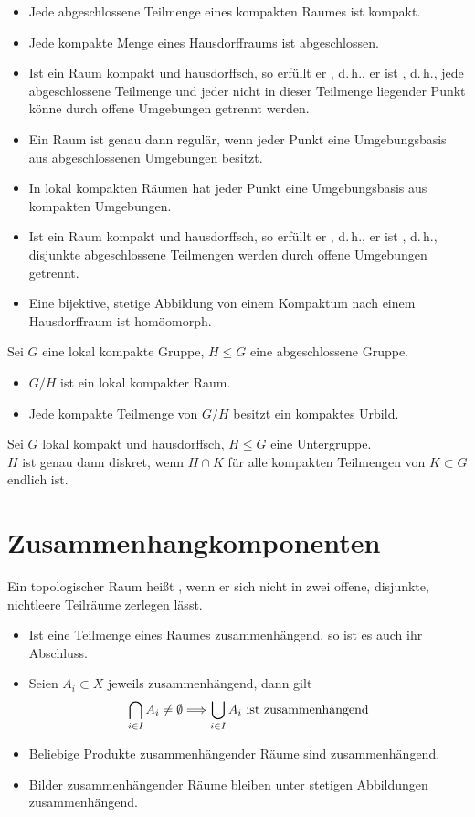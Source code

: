 \documentclass{book}
\begin{document}
\Bem{}
\begin{itemize}
\item Jede abgeschlossene Teilmenge eines kompakten Raumes ist kompakt.
\item Jede kompakte Menge eines Hausdorffraums ist abgeschlossen.
\item Ist ein Raum kompakt und hausdorffsch, so erfüllt er , d.\,h., er ist , d.\,h., jede abgeschlossene Teilmenge und jeder nicht in dieser Teilmenge liegender Punkt könne durch offene Umgebungen getrennt werden.
\item Ein Raum ist genau dann regulär, wenn jeder Punkt eine Umgebungsbasis aus abgeschlossenen Umgebungen besitzt.
\item In lokal kompakten Räumen hat jeder Punkt eine Umgebungsbasis aus kompakten Umgebungen.
\item Ist ein Raum kompakt und hausdorffsch, so erfüllt er , d.\,h., er ist , d.\,h., disjunkte abgeschlossene Teilmengen werden durch offene Umgebungen getrennt.
\item Eine bijektive, stetige Abbildung von einem Kompaktum nach einem Hausdorffraum ist homöomorph.
\end{itemize}

\Prop{}
Sei $G$ eine lokal kompakte Gruppe, $H\leq G$ eine abgeschlossene Gruppe.
\begin{itemize}
\item $G/H$ ist ein lokal kompakter Raum.
\item Jede kompakte Teilmenge von $G/H$ besitzt ein kompaktes Urbild.
\end{itemize}

\Prop{}
Sei $G$ lokal kompakt und hausdorffsch, $H \leq G$ eine Untergruppe.\\
$H$ ist genau dann diskret, wenn $H\cap K$ für alle kompakten Teilmengen von $K \subset G$ endlich ist.

\section{Zusammenhangkomponenten}
\Def{}
Ein topologischer Raum heißt , wenn er sich nicht in zwei offene, disjunkte, nichtleere Teilräume zerlegen lässt.

\Bem{}
\begin{itemize}
\item Ist eine Teilmenge eines Raumes zusammenhängend, so ist es auch ihr Abschluss.
\item Seien $A_i \subset X$ jeweils zusammenhängend, dann gilt
\[ \bigcap_{i\in I}A_i \neq \emptyset \overset{}{\Longrightarrow} \bigcup_{i\in I} A_i \text{ ist zusammenhängend} \]
\item Beliebige Produkte zusammenhängender Räume sind zusammenhängend.
\item Bilder zusammenhängender Räume bleiben unter stetigen Abbildungen zusammenhängend.
\end{itemize}
\end{document}
